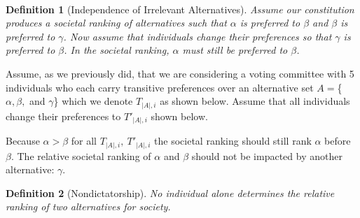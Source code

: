 \documentclass{amsart}
\newtheorem{definition}{Definition}
\theoremstyle{plain}
\begin{document}
\\

\begin{definition} [Independence of Irrelevant Alternatives]
Assume our constitution produces a societal ranking of alternatives such that $\alpha$ is preferred to $\beta$ and $\beta$ is preferred to $\gamma$. Now assume that individuals change their preferences so that $\gamma$ is preferred to $\beta$. In the societal ranking, $\alpha$ must still be preferred to $\beta$.
\end{definition}

\noindent Assume, as we previously did, that we are considering a voting committee with 5 individuals who each carry transitive preferences over an alternative set $A = $\{$\alpha, \beta,$ and $\gamma$\} which we denote $T_{|A|,i}$ as shown below. Assume that all individuals change their preferences to $T'_{|A|,i}$ shown below.

\begin{center}
    

\end{center}

\noindent Because $\alpha > \beta$ for all $T_{|A|,i}, \: T'_{|A|,i}$ the societal ranking should still rank $\alpha$ before $\beta$. The relative societal ranking of $\alpha$ and $\beta$ should not be impacted by another alternative: $\gamma$.

\begin{definition}[Nondictatorship]
No individual alone determines the relative ranking of two alternatives for society.
\end{definition}
\end{document}
